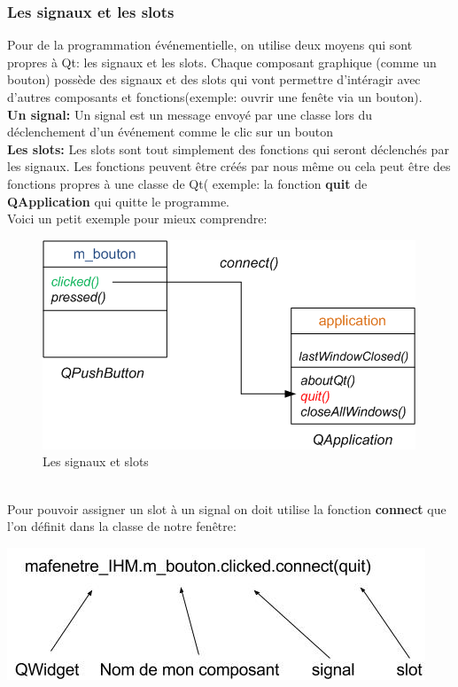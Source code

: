 \documentclass[a4paper,11pt]{article}
\begin{document}
\subsubsection{Les signaux et les slots}
Pour de la programmation événementielle, on utilise deux moyens qui sont propres à Qt: les signaux et les slots. Chaque composant graphique (comme un bouton) possède des signaux et des slots qui vont permettre d'intéragir avec d'autres composants et fonctions(exemple: ouvrir une fenête via un bouton).\\
\linebreak
\textbf{Un signal:} Un signal est un message envoyé par une classe lors du déclenchement d'un événement comme le clic sur un bouton\\
\textbf{Les slots:} Les slots sont tout simplement des fonctions qui seront déclenchés par les signaux. Les fonctions peuvent être créés par nous même ou cela peut être des fonctions propres à une classe de Qt( exemple: la fonction \textbf{quit} de \textbf{QApplication} qui quitte le programme.\\
Voici un petit exemple pour mieux comprendre:\\
\begin{figure}[hbtp]
\centering
\includegraphics[scale=0.5]{exemple_signal_slot.png}
\caption{Les signaux et slots}
\end{figure}\\
Pour pouvoir assigner un slot à un signal on doit utilise la fonction \textbf{connect} que l'on définit dans la classe de notre fenêtre:
\begin{center}
\includegraphics[scale=0.4]{signal_slot.jpg} 
\end{center}
\end{document}
